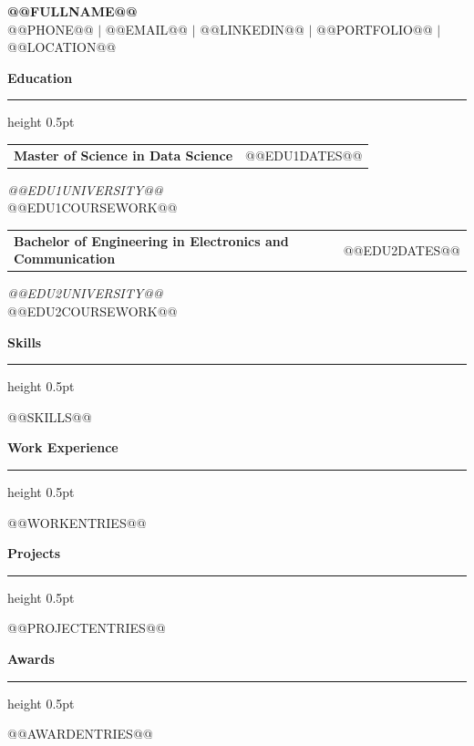 \documentclass[letterpaper,10pt]{article}
\makeatletter
\renewcommand{\normalsize}{\fontsize{9.5pt}{11.5pt}\selectfont}
\newcommand{\ressection}[1]{%
  \vspace{4pt}%
  {\bfseries\normalsize #1}%
  \vspace{2pt}%
  \hrule height 0.5pt%
  \vspace{3pt}%
}
\newcommand{\entry}[2]{%
  \noindent\begin{tabularx}{\textwidth}{@{}X r@{}}
    \textbf{#1} & #2
  \end{tabularx}\vspace{-3pt}%
}
\newcommand{\subentry}[1]{%
  {\small\textit{#1}}\vspace{0pt}%
}
\makeatother
\begin{document}
\begin{center}
  {\LARGE\textbf{@@FULLNAME@@}}\\[2pt]
  {\small @@PHONE@@ $|$ @@EMAIL@@ $|$ @@LINKEDIN@@ $|$ @@PORTFOLIO@@ $|$ @@LOCATION@@}
\end{center}
\vspace{-2pt}

\ressection{Education}

\entry{Master of Science in Data Science}{@@EDU1DATES@@}
\subentry{@@EDU1UNIVERSITY@@}\\
{\small @@EDU1COURSEWORK@@}

\vspace{1pt}
\entry{Bachelor of Engineering in Electronics and Communication}{@@EDU2DATES@@}
\subentry{@@EDU2UNIVERSITY@@}\\
{\small @@EDU2COURSEWORK@@}

\ressection{Skills}
\vspace{-2pt}
\begin{itemize}
@@SKILLS@@
\end{itemize}

\ressection{Work Experience}

@@WORKENTRIES@@

\ressection{Projects}

@@PROJECTENTRIES@@

\ressection{Awards}

@@AWARDENTRIES@@
\end{document}
